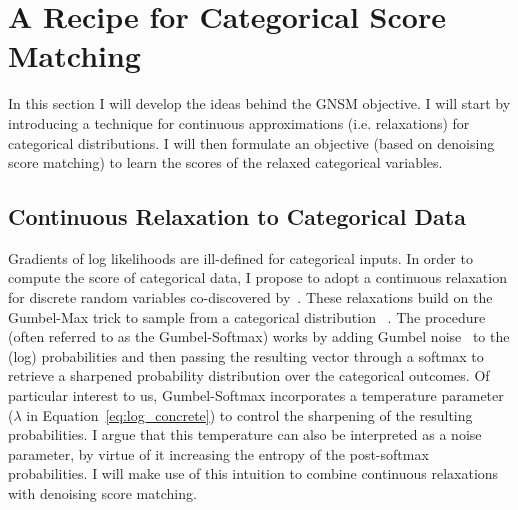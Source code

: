 


\section{A Recipe for Categorical Score Matching}
\label{sec:recipe}

In this section I will develop the ideas behind the GNSM objective. I will start by introducing a technique for continuous approximations (i.e. relaxations) for categorical distributions. I will then formulate an objective (based on denoising score matching) to learn the scores of the relaxed categorical variables. 

\subsection*{Continuous Relaxation to Categorical Data}

Gradients of log likelihoods are ill-defined for categorical inputs. In order to compute the score of categorical data, I propose to adopt a continuous relaxation for discrete random variables co-discovered by~\cite{jang2017categorical, maddison2017concrete}. These relaxations build on the Gumbel-Max trick to sample from a categorical distribution ~\cite{maddison2014sampling}. The procedure (often referred to as the Gumbel-Softmax) works by adding Gumbel noise~\cite{gumbel1954statistical} to the (log) probabilities and then passing the resulting vector through a softmax to retrieve a sharpened probability distribution over the categorical outcomes. Of particular interest to us, Gumbel-Softmax incorporates a temperature parameter ($\lambda$ in Equation~\eqref{eq:log_concrete}) to control the sharpening of the resulting probabilities. I argue that this temperature can also be interpreted as a noise parameter, by virtue of it increasing the entropy of the post-softmax probabilities. I will make use of this intuition to combine continuous relaxations with denoising score matching. 

